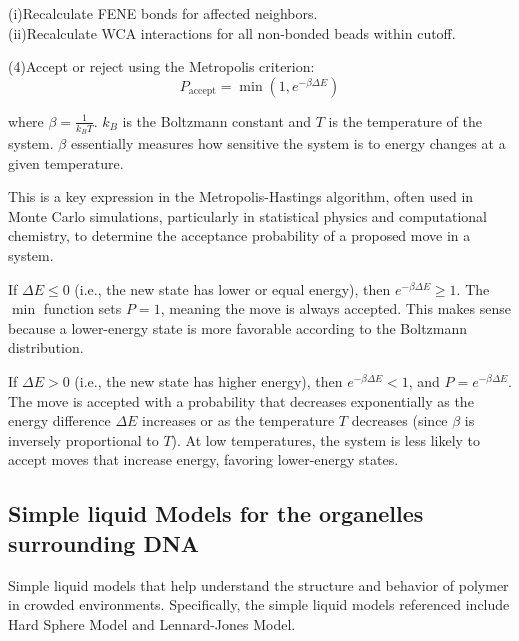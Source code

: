 \documentclass[12pt]{article}
\begin{document}
\begin{flushleft}
\setlength{\parindent}{100pt}(i)Recalculate FENE bonds for affected neighbors.\\
(ii)Recalculate WCA interactions for all non-bonded beads within cutoff.\\
\setlength{\parindent}{0pt}


\setlength{\parindent}{6em}(4)Accept or reject using the Metropolis criterion:
\setlength{\parindent}{0pt}
\begin{equation}
P_{\text{accept}} = \min \left(1, e^{-\beta \Delta E}\right)
\end{equation}

where $\beta = \frac{1}{k_B T}$. $k_B$ is the Boltzmann constant and $T$ is the temperature of the system. $\beta$ essentially measures how sensitive the system is to energy changes at a given temperature.

\setlength{\parindent}{45pt}

This is a key expression in the Metropolis-Hastings algorithm, often used in Monte Carlo simulations, particularly in statistical physics and computational chemistry, to determine the acceptance probability of a proposed move in a system.




If $\Delta E \leq 0$ (i.e., the new state has lower or equal energy), then $e^{-\beta \Delta E} \geq 1$. The $\min$ function sets $P = 1$, meaning the move is always accepted. This makes sense because a lower-energy state is more favorable according to the Boltzmann distribution.

If $\Delta E > 0$ (i.e., the new state has higher energy), then $e^{-\beta \Delta E} < 1$, and $P = e^{-\beta \Delta E}$. The move is accepted with a probability that decreases exponentially as the energy difference $\Delta E$ increases or as the temperature $T$ decreases (since $\beta$ is inversely proportional to $T$). At low temperatures, the system is less likely to accept moves that increase energy, favoring lower-energy states.

\vspace{-1em} 
\subsection*{Simple liquid Models for the organelles surrounding DNA}

Simple liquid models that help understand the structure and behavior of polymer in crowded environments. Specifically, the simple liquid models referenced include Hard Sphere Model and Lennard-Jones Model. 


\end{flushleft}
\end{document}
